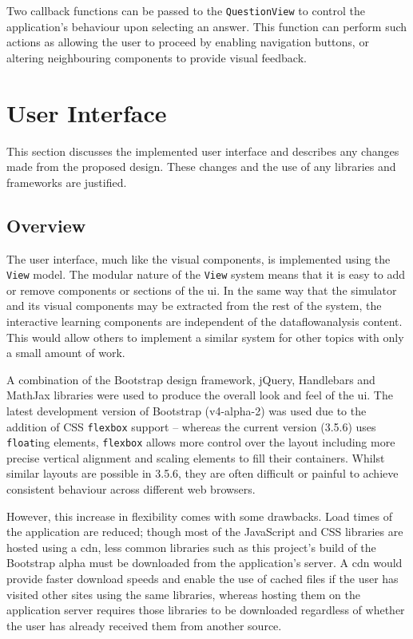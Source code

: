 \documentclass[bsc,twoside,singlespacing,parskip,logo,notimes,normalheadings]{infthesis}
\begin{document}
        Two callback functions can be passed to the {\tt QuestionView}
        to control the application's behaviour upon selecting an
        answer. This function can perform such actions as allowing the
        user to proceed by enabling navigation buttons, or altering
        neighbouring components to provide visual feedback.
            
    \pagebreak

    \section{User Interface}
    This section discusses the implemented user interface and
    describes any changes made from the proposed design. These changes
    and the use of any libraries and frameworks are justified.
    
        \subsection{Overview}
    
        The user interface, much like the visual components, is
        implemented using the {\tt View} model. The modular nature of
        the {\tt View} system means that it is easy to add or remove
        components or sections of the \gls{ui}. In the same way that the
        simulator and its visual components may be extracted from the
        rest of the system, the interactive learning components are
        independent of the \gls{dataflowanalysis} content. This would
        allow others to implement a similar system for other topics
        with only a small amount of work.

        A combination of the Bootstrap design framework, jQuery,
        Handlebars and MathJax libraries were used to produce the
        overall look and feel of the \gls{ui}. The latest development
        version of Bootstrap (v4-alpha-2) was used due to the addition
        of CSS {\tt flexbox} support -- whereas the current version
        (3.5.6) uses {\tt float}ing elements, {\tt flexbox} allows
        more control over the layout including more precise vertical
        alignment and scaling elements to fill their
        containers. Whilst similar layouts are possible in 3.5.6, they
        are often difficult or painful to achieve consistent behaviour
        across different web browsers.

        However, this increase in flexibility comes with some
        drawbacks. Load times of the application are reduced; though
        most of the JavaScript and CSS libraries are hosted using a
        \gls{cdn}, less common libraries such as this project's build
        of the Bootstrap alpha must be downloaded from the
        application's server. A \gls{cdn} would provide faster
        download speeds and enable the use of cached files if the user
        has visited other sites using the same libraries, whereas
        hosting them on the application server requires those
        libraries to be downloaded regardless of whether the user has
        already received them from another source.
    
\end{document}
